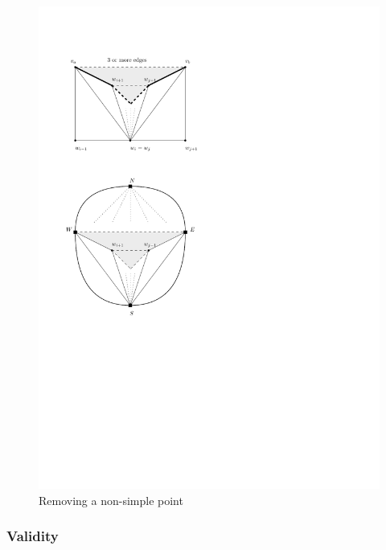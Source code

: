     \begin{figure}[h!]
    \centering
    \includegraphics[scale=1]{redAlgo/img/removeNonSimplePoint}

    \caption{Removing a non-simple point
        \label{fig:removeNonSimplePoint}}
    \end{figure}

\subsubsection{Validity}
  \label{ss:validity}


